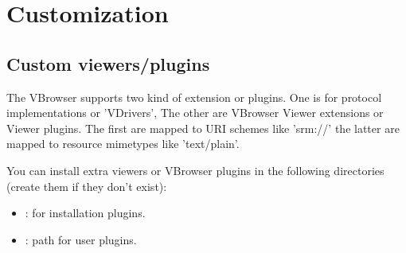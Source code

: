 %
%

\chapter{Customization}
\label{chap:customization}

\section{Custom viewers/plugins}

The VBrowser supports two kind of extension or plugins. One is for protocol 
implementations or 'VDrivers', The other are VBrowser Viewer extensions or Viewer 
plugins. The first are mapped to URI schemes like 'srm://' the latter are mapped to 
resource mimetypes like 'text/plain'. \\
\par
You can install extra viewers or VBrowser plugins in the following directories 
(create them if they don't exist):

\begin{itemize}
  \item {}: for installation plugins.
    \item {}: path for user plugins.
\end{itemize}

